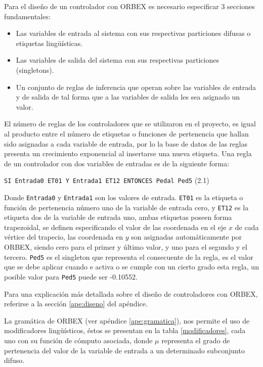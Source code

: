 Para el diseño de un controlador con \gls{ORBEX} es necesario especificar 3 secciones fundamentales:
\begin{itemize}
    
    \item Las variables de entrada al sistema con sus respectivas particiones difusas o etiquetas lingüísticas.
    
    \item Las variables de salida del sistema con sus respectivas particiones (\gls{singletons}). 
    
    \item Un conjunto de reglas de inferencia que operan sobre las variables de entrada y de salida de tal forma que a las variables de salida les sea asignado un valor.
\end{itemize}

El número de reglas de los controladores que se utilizaron en el proyecto, es igual al producto entre el número de etiquetas o funciones de pertenencia que hallan sido asignadas a cada variable de entrada, por lo la base de datos de las reglas presenta un crecimiento exponencial al insertarse una nueva etiqueta. Una regla de un controlador con dos variables de entradas es de la siguiente forma:

\begin{center}
{\tt SI Entrada0 ET01 Y Entrada1 ET12 ENTONCES Pedal Ped5} \hspace{4 cm}(2.1)
\end{center} 

Donde \verb,Entrada0, y \verb,Entrada1, son los valores de entrada. \verb,ET01, es la etiqueta o función de pertenencia número uno de la variable de entrada cero, y \verb,ET12, es la etiqueta dos de la variable de entrada uno, ambas etiquetas poseen forma trapezoidal, se definen especificando el valor de las coordenada en el eje $x$ de cada vértice del trapecio, las coordenada en $y$ son asignadas automáticamente por \gls{ORBEX}, siendo cero para el primer y último valor, y  uno para el segundo y el tercero. \verb,Ped5, es el singleton que representa el consecuente de la regla, es el valor que se debe aplicar cuando e activa o se cumple con un cierto grado esta regla, un posible valor para \verb,Ped5, puede ser -0.10552.  

Para una explicación más detallada sobre el diseño de controladores con \gls{ORBEX}, referirse a la sección \ref{ape:diseno} del apéndice.

La gramática de \gls{ORBEX} (ver apéndice \ref{ape:gramatica}), nos permite el uso de modificadores lingüísticos, éstos se presentan en la tabla \ref{modificadores}, cada uno con su función de cómputo asociada, donde $\mu$ representa el grado de pertenencia del valor de la variable de entrada a un determinado subconjunto difuso.

